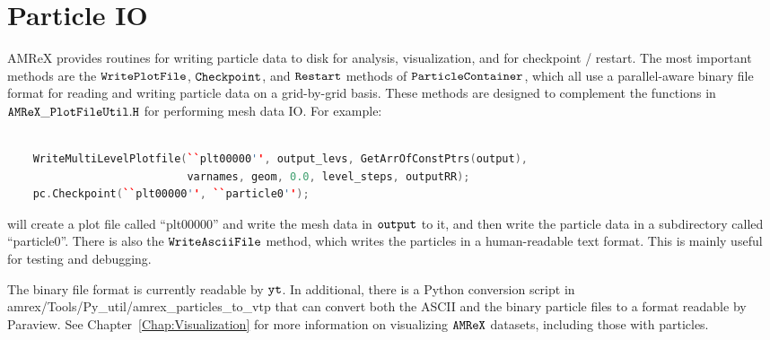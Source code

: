 \section{Particle IO}
\label{sec:Particles:IO}

AMReX provides routines for writing particle data to disk for analysis, visualization, and for checkpoint / restart. The most important methods are the $\tt{WritePlotFile}$, $\tt{Checkpoint}$, and $\tt{Restart}$ methods of $\tt{ParticleContainer}$, which all use a parallel-aware binary file format for reading and writing particle data on a grid-by-grid basis. These methods are designed to complement the functions in $\tt{AMReX\_PlotFileUtil.H}$ for performing mesh data IO. For example:

\begin{lstlisting}[language=cpp]

    WriteMultiLevelPlotfile(``plt00000'', output_levs, GetArrOfConstPtrs(output),
                            varnames, geom, 0.0, level_steps, outputRR);
    pc.Checkpoint(``plt00000'', ``particle0'');

\end{lstlisting}

will create a plot file called ``plt00000'' and write the mesh data in $\tt{output}$ to it, and then write the particle data in a subdirectory called ``particle0''. There is also the $\tt{WriteAsciiFile}$ method, which writes the particles in a human-readable text format. This is mainly useful for testing and debugging.

The binary file format is currently readable by $\tt{yt}$. In additional, there is a Python conversion script in amrex/Tools/Py\_util/amrex\_particles\_to\_vtp that can convert both the ASCII and the binary particle files to a format readable by Paraview. See Chapter~\ref{Chap:Visualization} for more information on visualizing $\tt{AMReX}$ datasets, including those with particles. 

